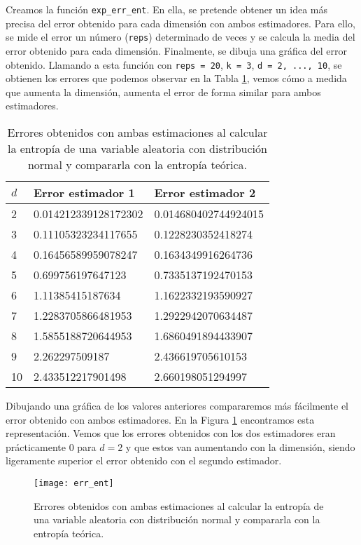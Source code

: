 \documentclass[10pt,a4paper]{article} %
\theoremstyle{definition}
\begin{document}
Creamos la función \texttt{exp\_err\_ent}. En ella, se pretende obtener un idea más precisa del error obtenido para cada dimensión con ambos estimadores. Para ello, se mide el error un número (\texttt{reps}) determinado de veces y se calcula la media del error obtenido para cada dimensión. Finalmente, se dibuja una gráfica del error obtenido. Llamando a esta función con \texttt{reps = 20}, \texttt{k = 3}, \texttt{d = 2, ..., 10}, se obtienen los errores que podemos observar en la Tabla \ref{tab:err_ent}, vemos cómo a medida que aumenta la dimensión, aumenta el error de forma similar para ambos estimadores.

\begin{table}[H]
\centering
\caption{Errores obtenidos con ambas estimaciones al calcular la entropía de una variable aleatoria con distribución normal y compararla con la entropía teórica.}
\label{tab:err_ent}
\begin{tabular}{lll}
\toprule
$d$ & Error estimador 1 & Error estimador 2\\ \midrule
2 & 0.014212339128172302 & 0.014680402744924015\\
3 & 0.11105323234117655 & 0.1228230352418274\\
4 & 0.16456589959078247 & 0.1634349916264736\\
5 & 0.699756197647123 & 0.7335137192470153\\
6 & 1.11385415187634 & 1.1622332193590927\\
7 & 1.2283705866481953 & 1.2922942070634487\\
8 & 1.5855188720644953 & 1.6860491894433907\\
9 & 2.262297509187 & 2.436619705610153\\
10 & 2.433512217901498 & 2.660198051294997\\
\bottomrule
\end{tabular}
\end{table}

Dibujando una gráfica de los valores anteriores compararemos más fácilmente el error obtenido con ambos estimadores. En la Figura \ref{fig:err_ent} encontramos esta representación. Vemos que los errores obtenidos con los dos estimadores eran prácticamente 0 para $d=2$ y que estos van aumentando con la dimensión, siendo ligeramente superior el error obtenido con el segundo estimador. 

\begin{figure}[H]
    \centering
    \texttt{[image: err\_ent]}
    \caption{Errores obtenidos con ambas estimaciones al calcular la entropía de una variable aleatoria con distribución normal y compararla con la entropía teórica.}
    \label{fig:err_ent}
\end{figure}
\end{document}
